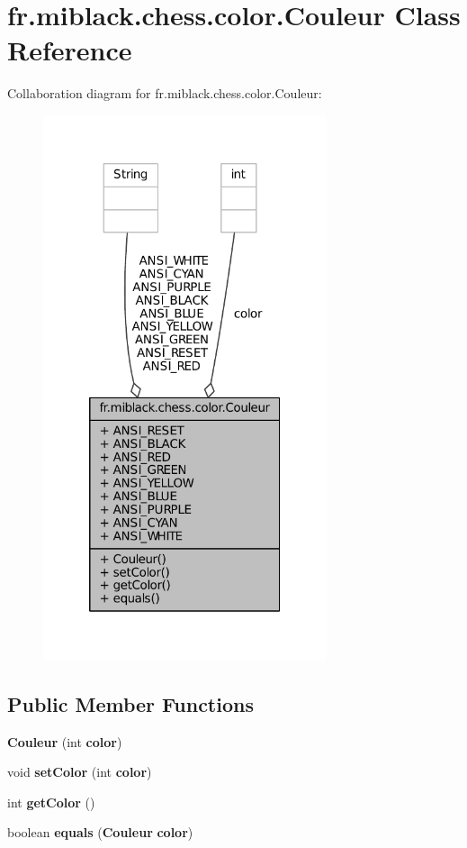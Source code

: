 \section{fr.\-miblack.\-chess.\-color.\-Couleur Class Reference}
\label{classfr_1_1miblack_1_1chess_1_1color_1_1Couleur}


Collaboration diagram for fr.\-miblack.\-chess.\-color.\-Couleur\-:
\nopagebreak
\begin{figure}[H]
\begin{center}
\leavevmode
\includegraphics[width=236pt]{classfr_1_1miblack_1_1chess_1_1color_1_1Couleur__coll__graph}
\end{center}
\end{figure}
\subsection*{Public Member Functions}
\begin{DoxyCompactItemize}
\item 
{\bf Couleur} (int {\bf color})
\item 
void {\bf set\-Color} (int {\bf color})
\item 
int {\bf get\-Color} ()
\item 
boolean {\bf equals} ({\bf Couleur} {\bf color})
\end{DoxyCompactItemize}
